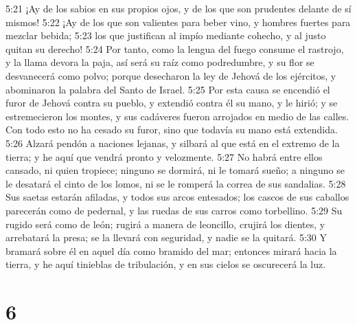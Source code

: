 5:21 ¡Ay de los sabios en sus propios ojos, y de los que son prudentes delante de sí mismos!  
5:22 ¡Ay de los que son valientes para beber vino, y hombres fuertes para mezclar bebida;  
5:23 los que justifican al impío mediante cohecho, y al justo quitan su derecho!  
5:24 Por tanto, como la lengua del fuego consume el rastrojo, y la llama devora la paja, así será su raíz como podredumbre, y su flor se desvanecerá como polvo; porque desecharon la ley de Jehová de los ejércitos, y abominaron la palabra del Santo de Israel.  
5:25 Por esta causa se encendió el furor de Jehová contra su pueblo, y extendió contra él su mano, y le hirió; y se estremecieron los montes, y sus cadáveres fueron arrojados en medio de las calles. Con todo esto no ha cesado su furor, sino que todavía su mano está extendida.  
5:26 Alzará pendón a naciones lejanas, y silbará al que está en el extremo de la tierra; y he aquí que vendrá pronto y velozmente.  
5:27 No habrá entre ellos cansado, ni quien tropiece; ninguno se dormirá, ni le tomará sueño; a ninguno se le desatará el cinto de los lomos, ni se le romperá la correa de sus sandalias.  
5:28 Sus saetas estarán afiladas, y todos sus arcos entesados; los cascos de sus caballos parecerán como de pedernal, y las ruedas de sus carros como torbellino.  
5:29 Su rugido será como de león; rugirá a manera de leoncillo, crujirá los dientes, y arrebatará la presa; se la llevará con seguridad, y nadie se la quitará.  
5:30 Y bramará sobre él en aquel día como bramido del mar; entonces mirará hacia la tierra, y he aquí tinieblas de tribulación, y en sus cielos se oscurecerá la luz.  

\chapter{6}

